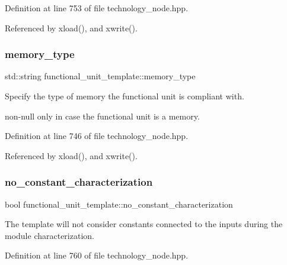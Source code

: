 Definition at line 753 of file technology\+\_\+node.\+hpp.



Referenced by xload(), and xwrite().

\mbox{\label{structfunctional__unit__template_ab3660a5fa2b6f9fa95f905211f3a9617}} 
\subsubsection{\texorpdfstring{memory\+\_\+type}{memory\_type}}
{\footnotesize\ttfamily std\+::string functional\+\_\+unit\+\_\+template\+::memory\+\_\+type}



Specify the type of memory the functional unit is compliant with. 

non-\/null only in case the functional unit is a memory. 

Definition at line 746 of file technology\+\_\+node.\+hpp.



Referenced by xload(), and xwrite().

\mbox{\label{structfunctional__unit__template_af2d438fef9b54228ee23e0a85279a6fa}} 
\subsubsection{\texorpdfstring{no\+\_\+constant\+\_\+characterization}{no\_constant\_characterization}}
{\footnotesize\ttfamily bool functional\+\_\+unit\+\_\+template\+::no\+\_\+constant\+\_\+characterization}



The template will not consider constants connected to the inputs during the module characterization. 



Definition at line 760 of file technology\+\_\+node.\+hpp.



